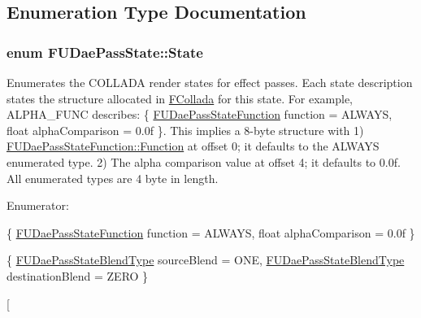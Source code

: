 \subsection{Enumeration Type Documentation}
\hypertarget{namespaceFUDaePassState_a99a648050f80bc29359e932cffa8c973}{
\subsubsection[{State}]{\setlength{\rightskip}{0pt plus 5cm}enum {\bf FUDaePassState::State}}}
\label{namespaceFUDaePassState_a99a648050f80bc29359e932cffa8c973}
Enumerates the COLLADA render states for effect passes. Each state description states the structure allocated in \hyperlink{namespaceFCollada}{FCollada} for this state. For example, ALPHA\_\-FUNC describes: \{ \hyperlink{namespaceFUDaePassStateFunction}{FUDaePassStateFunction} function = ALWAYS, float alphaComparison = 0.0f \}. This implies a 8-\/byte structure with 1) \hyperlink{namespaceFUDaePassStateFunction_af0f6fbb32c14e5a19559a6630f783313}{FUDaePassStateFunction::Function} at offset 0; it defaults to the ALWAYS enumerated type. 2) The alpha comparison value at offset 4; it defaults to 0.0f. All enumerated types are 4 byte in length. \begin{Desc}
\item[Enumerator: ]\par
\begin{description}
\item[{\em 
\hypertarget{namespaceFUDaePassState_a99a648050f80bc29359e932cffa8c973a2206d5d871730ba023a86011293ed9b5}{
ALPHA\_\-FUNC}
\label{namespaceFUDaePassState_a99a648050f80bc29359e932cffa8c973a2206d5d871730ba023a86011293ed9b5}
}]\{ \hyperlink{namespaceFUDaePassStateFunction}{FUDaePassStateFunction} function = ALWAYS, float alphaComparison = 0.0f \} \item[{\em 
\hypertarget{namespaceFUDaePassState_a99a648050f80bc29359e932cffa8c973a5c30f96ead83aaf455e93bc7700511d0}{
BLEND\_\-FUNC}
\label{namespaceFUDaePassState_a99a648050f80bc29359e932cffa8c973a5c30f96ead83aaf455e93bc7700511d0}
}]\{ \hyperlink{namespaceFUDaePassStateBlendType}{FUDaePassStateBlendType} sourceBlend = ONE, \hyperlink{namespaceFUDaePassStateBlendType}{FUDaePassStateBlendType} destinationBlend = ZERO \} \item[{\em 
}
\end{description}
\end{Desc}
